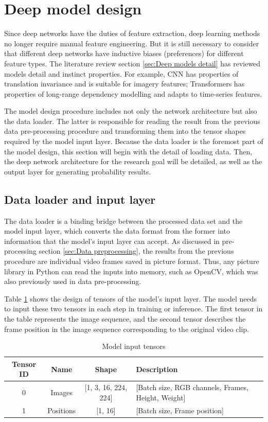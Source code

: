 \section{Deep model design}
\label{sec:Deep model design}
Since deep networks have the duties of feature extraction, deep learning methods no longer require manual feature engineering.
But it is still necessary to consider that different deep networks have inductive biases (preferences) for different feature types.
The literature review section \ref{sec:Deep models detail} has reviewed models detail and instinct properties.
For example, CNN has properties of translation invariance and is suitable for imagery features; Transformers has properties of long-range dependency modelling and adapts to time-series features.

The model design procedure includes not only the network architecture but also the data loader.
The latter is responsible for reading the result from the previous data pre-processing procedure and transforming them into the tensor shapes required by the model input layer.
Because the data loader is the foremost part of the model design, this section will begin with the detail of loading data.
Then, the deep network architecture for the research goal will be detailed, as well as the output layer for generating probability results.

\subsection{Data loader and input layer}
The data loader is a binding bridge between the processed data set and the model input layer, which converts the data format from the former into information that the model's input layer can accept.
As discussed in pre-processing section \ref{sec:Data preprocessing}, the results from the previous procedure are individual video frames saved in picture format.
Thus, any picture library in Python can read the inputs into memory, such as OpenCV, which was also previously used in data pre-processing.

Table \ref{tab:Model input tensors} shows the design of tensors of the model's input layer.
The model needs to input these two tensors in each step in training or inference.
The first tensor in the table represents the image sequence, and the second tensor describes the frame position in the image sequence corresponding to the original video clip.

\begin{table}[!ht]
\renewcommand{\arraystretch}{1.2}
\begin{tabularx}{\textwidth}{|c|c|c|X|}
\hline
Tensor ID & Name           & Shape                    & Description                                            \\ \hline
0         & Images   & {[}1, 3, 16, 224, 224{]} & {[}Batch size, RGB channels, Frames, Height, Weight{]} \\ \hline
1         & Positions & {[}1, 16{]}              & {[}Batch size, Frame position{]}                       \\ \hline
\end{tabularx}
\caption{Model input tensors}
\label{tab:Model input tensors}
\end{table}

